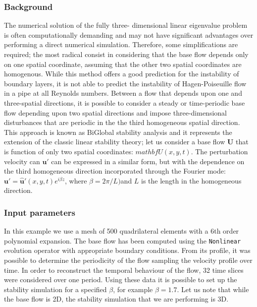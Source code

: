 \subsubsection{Background}

The numerical solution of the fully three- dimensional linear eigenvalue problem is often computationally demanding and may not have significant advantages over performing a direct numerical simulation. Therefore, some simplifications are required; the most radical consist in considering that the base flow depends only on one spatial coordinate, assuming that the other two spatial coordinates are homogenous.  While this method offers a good prediction for the instability of boundary layers, it is not able to predict the instability of Hagen-Poiseuille flow in a pipe at all Reynolds numbers.  Between a flow that depends upon one and three-spatial directions, it is possible to consider a steady or time-periodic base flow depending upon two spatial directions and impose three-dimensional disturbances that are periodic in the the third homogeneous  spatial direction. This approach is known as BiGlobal stability analysis and it represents the extension of the classic linear stability theory; let us consider a base flow $\mathbf{U}$ that is function of only two spatial coordinates: $mathbf{U}(x, y,t)$. The perturbation velocity can $\mathbf{u'}$ can be expressed in a similar form, but with the dependence on the third homogeneous direction incorporated through the Fourier mode: $\mathbf{u'}=\mathbf{\hat{u}'}(x, y, t) e^{i \beta z}$, where $\beta=2\pi/L)$and $L$ is the length in the homogeneous direction.

\subsubsection{Input parameters}

In this example we use a mesh of 500 quadrilateral elements with a 6th order polynomial expansion. The base flow has been computed using the \texttt{Nonlinear} evolution operator with appropriate boundary conditions. From its profile, it was possible to determine the periodicity of the flow sampling the velocity profile over time. In order to reconstruct the temporal behaviour of the flow, 32 time slices were considered over one period. Using these data it is possible to set up the stability simulation for a specified $\beta$, for example $\beta=1.7$. Let us note that while the base flow is 2D, the stability simulation that we are performing is 3D.

